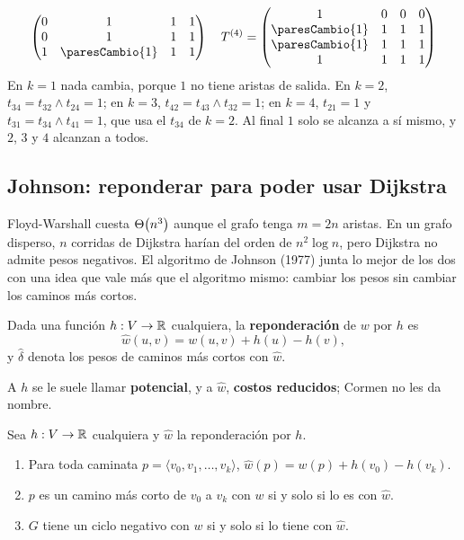 \documentclass[11pt,letterpaper]{article}
\begin{document}
\begin{ejemplo}
{\[\begin{pmatrix}
    0 & 1 & 1 & 1 \\
    0 & 1 & 1 & 1 \\
    1 & \paresCambio{1} & 1 & 1
  \end{pmatrix}
  \quad
  T^{(4)} = \begin{pmatrix}
    1 & 0 & 0 & 0 \\
    \paresCambio{1} & 1 & 1 & 1 \\
    \paresCambio{1} & 1 & 1 & 1 \\
    1 & 1 & 1 & 1
  \end{pmatrix}
  \]
  }%
  En $k = 1$ nada cambia, porque $1$ no tiene aristas de salida. En
  $k = 2$, $t_{34} = t_{32} \land t_{24} = 1$; en $k = 3$,
  $t_{42} = t_{43} \land t_{32} = 1$; en $k = 4$, $t_{21} = 1$ y
  $t_{31} = t_{34} \land t_{41} = 1$, que usa el $t_{34}$ de $k = 2$.
  Al final $1$ solo se alcanza a sí mismo, y $2$, $3$ y $4$ alcanzan a
  todos.
\end{ejemplo}


\subsection*{Johnson: reponderar para poder usar Dijkstra}

Floyd-Warshall cuesta $\Theta\!\left(n^3\right)$ aunque el grafo tenga $m = 2n$
aristas. En un grafo disperso, $n$ corridas de Dijkstra harían del
orden de $n^2 \log n$, pero Dijkstra no admite pesos negativos. El
algoritmo de Johnson (1977) junta lo mejor de los dos con una idea que
vale más que el algoritmo mismo: cambiar los pesos sin cambiar los
caminos más cortos.

\begin{definicion}[Reponderación]
  \label{def:reponderacion-johnson}
  Dada una función $h : V \to \mathbb{R}$ cualquiera, la
  \textbf{reponderación} de $w$ por $h$ es
  \[
    \hat{w}(u, v) = w(u, v) + h(u) - h(v) ,
  \]
  y $\hat{\delta}$ denota los pesos de caminos más cortos con
  $\hat{w}$.
\end{definicion}

A $h$ se le suele llamar \textbf{potencial}, y a $\hat{w}$,
\textbf{costos reducidos}; Cormen no les da nombre.

\begin{lema}
  \label{lem:reponderacion-johnson}
  Sea $h : V \to \mathbb{R}$ cualquiera y $\hat{w}$ la reponderación por $h$.
  \begin{enumerate}[label=(\alph*), itemsep=0.1em]
    \item Para toda caminata
          $p = \langle v_0, v_1, \dots, v_k \rangle$,
          $\hat{w}(p) = w(p) + h(v_0) - h(v_k)$.
    \item $p$ es un camino más corto de $v_0$ a $v_k$ con $w$ si y
          solo si lo es con $\hat{w}$.
    \item $G$ tiene un ciclo negativo con $w$ si y solo si lo tiene
          con $\hat{w}$.
  \end{enumerate}
\end{lema}
\end{document}
